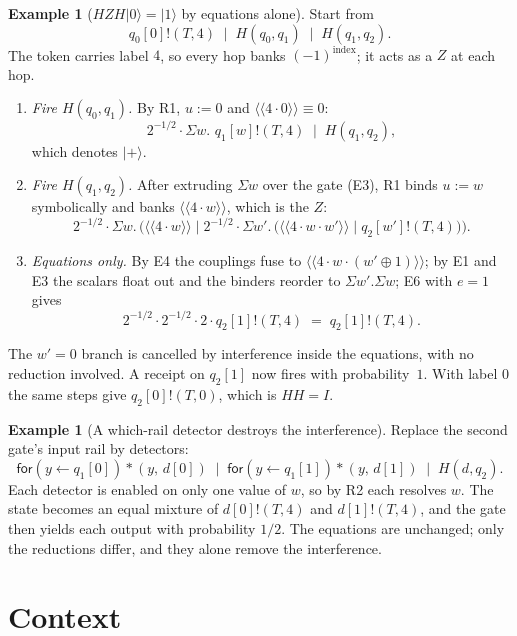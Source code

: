 \documentclass[11pt,a4paper]{article}
\theoremstyle{plain}
\theoremstyle{definition}
\newtheorem{example}[theorem]{Example}
\theoremstyle{remark}
\newcommand{\ket}[1]{\lvert #1 \rangle}
\newcommand{\cpl}[1]{\langle\!\langle #1 \rangle\!\rangle}
\newcommand{\rcv}[3]{\mathsf{for}(#1 \leftarrow #2)#3}
\newcommand{\bdrop}[2]{{*}(#1,\,#2)}
\newcommand{\Sig}[2]{\Sigma #1.\,#2}
\newcommand{\scong}{\equiv}
\begin{document}
\begin{example}[$HZH\ket{0}=\ket{1}$ by equations alone]\label{ex:hzh}
Start from
\[
  q_0[0]!(T,4)\;\mid\;H(q_0,q_1)\;\mid\;H(q_1,q_2).
\]
The token carries label $4$, so every hop banks $(-1)^{\mathrm{index}}$; it
acts as a $Z$ at each hop.
\begin{enumerate}[leftmargin=1.5em]
\item \emph{Fire $H(q_0,q_1)$.} By R1, $u:=0$ and $\cpl{4\cdot 0}\scong 0$:
  \[ 2^{-1/2}\cdot\Sig{w}{\,q_1[w]!(T,4)}\;\mid\;H(q_1,q_2), \]
  which denotes $\ket{+}$.
\item \emph{Fire $H(q_1,q_2)$.} After extruding $\Sigma w$ over the gate (E3),
  R1 binds $u:=w$ symbolically and banks $\cpl{4\cdot w}$, which is the $Z$:
  \[ 2^{-1/2}\cdot\Sig{w}{\Big(\cpl{4\cdot w}\mid 2^{-1/2}\cdot
     \Sig{w'}{\big(\cpl{4\cdot w\cdot w'}\mid q_2[w']!(T,4)\big)}\Big)}. \]
\item \emph{Equations only.} By E4 the couplings fuse to
  $\cpl{4\cdot w\cdot(w'\oplus 1)}$; by E1 and E3 the scalars float out and the
  binders reorder to $\Sigma w'.\Sigma w$; E6 with $e=1$ gives
  \[ 2^{-1/2}\cdot 2^{-1/2}\cdot 2\cdot q_2[1]!(T,4) \;=\; q_2[1]!(T,4). \]
\end{enumerate}
The $w'=0$ branch is cancelled by interference inside the equations, with no
reduction involved. A receipt on $q_2[1]$ now fires with probability~$1$.
With label $0$ the same steps give $q_2[0]!(T,0)$, which is $HH=I$.
\end{example}

\begin{example}[A which-rail detector destroys the interference]
Replace the second gate's input rail by detectors:
\[
  \rcv{y}{q_1[0]}{\bdrop{y}{d[0]}}\;\mid\;\rcv{y}{q_1[1]}{\bdrop{y}{d[1]}}
  \;\mid\; H(d,q_2).
\]
Each detector is enabled on only one value of $w$, so by R2 each resolves $w$.
The state becomes an equal mixture of $d[0]!(T,4)$ and $d[1]!(T,4)$, and the
gate then yields each output with probability $1/2$. The equations are
unchanged; only the reductions differ, and they alone remove the interference.
\end{example}

\section{Context}\label{sec:context}
\end{document}
